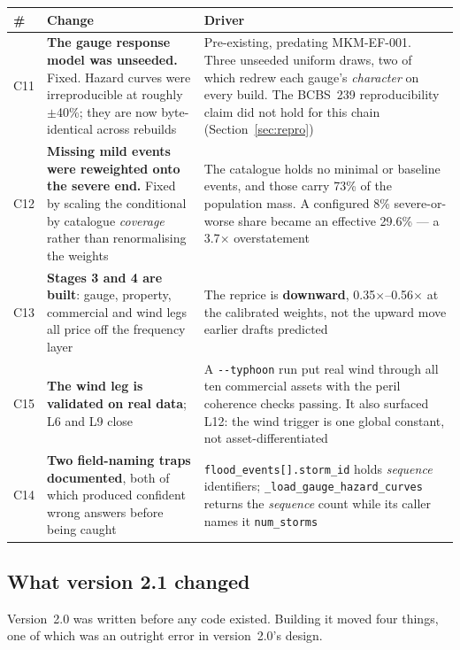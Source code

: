 \documentclass[11pt]{article}
\begin{document}
\begin{longtable}{@{}p{}p{}p{}@{}}
\toprule
\textbf{\#} & \textbf{Change} & \textbf{Driver} \\
\midrule
\endhead
C11 & \textbf{The gauge response model was unseeded.} Fixed. Hazard curves were
irreproducible at roughly $\pm$40\%; they are now byte-identical across rebuilds
& Pre-existing, predating MKM-EF-001. Three unseeded uniform draws, two of which
redrew each gauge's \emph{character} on every build. The BCBS~239
reproducibility claim did not hold for this chain
(Section~\ref{sec:repro}) \\
\addlinespace
C12 & \textbf{Missing mild events were reweighted onto the severe end.} Fixed by
scaling the conditional by catalogue \emph{coverage} rather than renormalising
the weights & The catalogue holds no minimal or baseline events, and those carry
73\% of the population mass. A configured 8\% severe-or-worse share became an
effective 29.6\% --- a 3.7$\times$ overstatement \\
\addlinespace
C13 & \textbf{Stages 3 and 4 are built}: gauge, property, commercial and wind
legs all price off the frequency layer & The reprice is \textbf{downward},
0.35$\times$--0.56$\times$ at the calibrated weights, not the upward move
earlier drafts predicted \\
\addlinespace
C15 & \textbf{The wind leg is validated on real data}; L6 and L9 close & A
\texttt{-{}-typhoon} run put real wind through all ten commercial assets with
the peril coherence checks passing. It also surfaced L12: the wind trigger is
one global constant, not asset-differentiated \\
\addlinespace
C14 & \textbf{Two field-naming traps documented}, both of which produced
confident wrong answers before being caught & \texttt{flood\_events[].storm\_id}
holds \emph{sequence} identifiers; \texttt{\_load\_gauge\_hazard\_curves}
returns the \emph{sequence} count while its caller names it
\texttt{num\_storms} \\
\bottomrule
\end{longtable}

\subsection{What version 2.1 changed}

Version~2.0 was written before any code existed. Building it moved four things,
one of which was an outright error in version~2.0's design.
\end{document}

